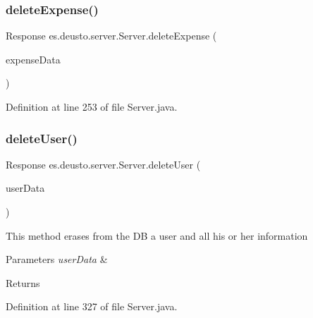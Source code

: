 \subsubsection{\texorpdfstring{delete\+Expense()}{deleteExpense()}}
{\footnotesize\ttfamily Response es.\+deusto.\+server.\+Server.\+delete\+Expense (\begin{DoxyParamCaption}\item[{\hyperlink{classes_1_1deusto_1_1serialization_1_1_expense_data}{Expense\+Data}}]{expense\+Data }\end{DoxyParamCaption})}



Definition at line 253 of file Server.\+java.

\mbox{\label{classes_1_1deusto_1_1server_1_1_server_a97535594f4d5406d52e93e093cf6c5bd}} 
\subsubsection{\texorpdfstring{delete\+User()}{deleteUser()}}
{\footnotesize\ttfamily Response es.\+deusto.\+server.\+Server.\+delete\+User (\begin{DoxyParamCaption}\item[{\hyperlink{classes_1_1deusto_1_1serialization_1_1_user_data}{User\+Data}}]{user\+Data }\end{DoxyParamCaption})}

This method erases from the DB a user and all his or her information 
\begin{DoxyParams}{Parameters}
{\em user\+Data} & \\
\hline
\end{DoxyParams}
\begin{DoxyReturn}{Returns}

\end{DoxyReturn}


Definition at line 327 of file Server.\+java.

\mbox{\label{classes_1_1deusto_1_1server_1_1_server_a12f56d7a970c3c41fefe8ed2db835c0a}} 
